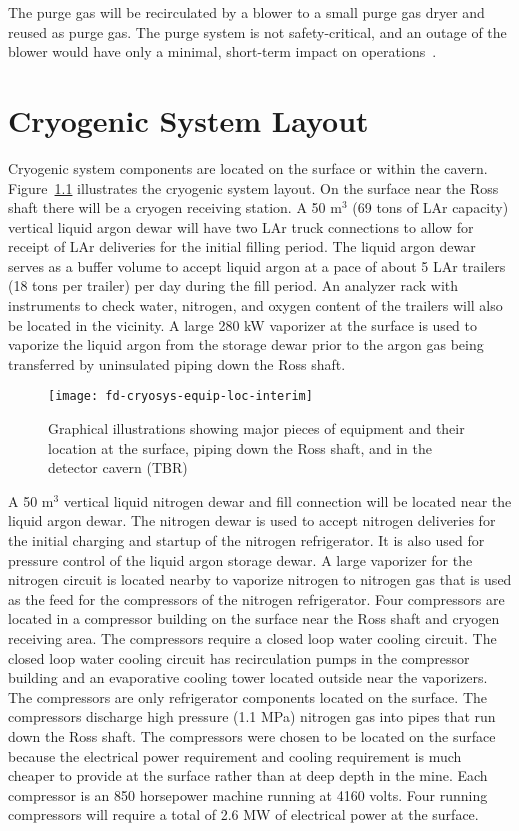 The purge gas will be recirculated by a blower to a small 
purge gas dryer and reused as purge gas. The purge system 
is not safety-critical, and an outage of the blower would 
have only a minimal, short-term impact on operations~\cite{docdb4303}.

\chapter{Cryogenic System Layout}
\label{sec:cryo-cryosys-layout}

Cryogenic system components are located on the surface or within the cavern. 
Figure~\ref{fig:eqp-at-surface}  illustrates the cryogenic system 
layout. On the surface near the Ross shaft there will be a cryogen 
receiving station. A 50 m$^3$ (69 tons of LAr capacity) 
vertical liquid argon dewar will have two LAr truck connections 
to allow for receipt of LAr deliveries for the initial
filling period. The liquid argon dewar serves as a buffer volume 
to accept liquid argon at a pace of about 5 LAr trailers 
(18 tons per trailer) per day during the fill period. An analyzer
rack with instruments to check water, nitrogen, and oxygen content 
of the trailers will also be located in the vicinity. A large 
280 kW vaporizer at the surface is used to vaporize the liquid
argon from the storage dewar prior to the argon gas being 
transferred by uninsulated piping down the Ross shaft.

\begin{figure}[htbp]
\centering
\texttt{[image: fd-cryosys-equip-loc-interim]} 
\caption{Graphical illustrations showing major pieces of equipment and their location at the
surface, piping down the Ross shaft, and in the detector cavern (TBR)}
\label{fig:eqp-at-surface}
\end{figure}


A 50 m$^3$ vertical liquid nitrogen dewar and fill connection will be 
located near the liquid argon dewar. The nitrogen dewar is used 
to accept nitrogen deliveries for the initial charging and startup of
the nitrogen refrigerator. It is also used for pressure control of 
the liquid argon storage dewar. A large vaporizer for the nitrogen 
circuit is located nearby to vaporize nitrogen to nitrogen gas
that is used as the feed for the compressors of the nitrogen 
refrigerator. Four compressors are located in a compressor 
building on the surface near the Ross shaft and cryogen
receiving area. The compressors require a closed loop water 
cooling circuit. The closed loop water cooling circuit has 
recirculation pumps in the compressor building and an evaporative
cooling tower located outside near the vaporizers. The 
compressors are only refrigerator components located on the surface. 
The compressors discharge high pressure (1.1 MPa) nitrogen gas into
pipes that run down the Ross shaft. The compressors were chosen 
to be located on the surface because the electrical power 
requirement and cooling requirement is much cheaper to provide
at the surface rather than at deep depth in the mine. Each 
compressor is an 850 horsepower machine running at 4160 volts. 
Four running compressors will require a total of
2.6 MW of electrical power at the surface.

